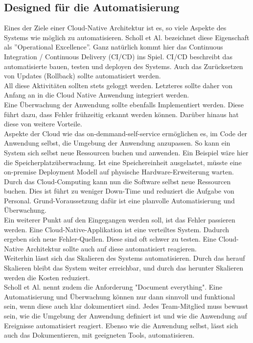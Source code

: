 \subsection{Designed für die Automatisierung}
Eines der Ziele einer Cloud-Native Architektur ist es, so viele Aspekte des Systems wie möglich zu automatisieren. Scholl et Al.\cite{scholl_cloud_2019} bezeichnet diese Eigenschaft als ''Operational Excellence''. Ganz natürlich kommt hier das Continuous Integration / Continuous Delivery (CI/CD) ins Spiel. CI/CD beschreibt das automatisierte bauen, testen und deployen des Systems. Auch das Zurücksetzen von Updates (Rollback) sollte automatisiert werden.\\
All diese Aktivitäten sollten stets geloggt werden. Letzteres sollte daher von Anfang an in die Cloud Native Anwendung integriert werden. \\
Eine Überwachung der Anwendung sollte ebenfalls Implementiert werden. Diese führt dazu, dass Fehler frühzeitig erkannt werden können. Darüber hinaus hat diese von weitere Vorteile.\\
Aspekte der Cloud wie das on-demmand-self-service ermöglichen es, im Code der Anwendung selbst, die Umgebung der Anwendung anzupassen. So kann ein System sich selbst neue Ressourcen buchen und anwenden. Ein Beispiel wäre hier die Speicherplatzüberwachung. Ist eine Speichereinheit ausgelastet, müsste eine on-premise Deployment Modell auf physische Hardware-Erweiterung warten. Durch das Cloud-Computing kann nun die Software selbst neue Ressourcen buchen. Dies ist führt zu weniger Down-Time und reduziert die Aufgabe von Personal. Grund-Voraussetzung dafür ist eine planvolle Automatisierung und Überwachung.\\ 
Ein weiterer Punkt auf den Eingegangen werden soll, ist das Fehler passieren werden. Eine Cloud-Native-Applikation ist eine verteiltes System. Dadurch ergeben sich neue Fehler-Quellen. Diese sind oft schwer zu testen. Eine Cloud-Native Architektur sollte auch auf diese automatisiert reagieren.\\
Weiterhin lässt sich das Skalieren des Systems automatisieren. Durch das herauf Skalieren bleibt das System weiter erreichbar, und durch das herunter Skalieren werden die Kosten reduziert.\\
Scholl et Al.\cite{scholl_cloud_2019} nennt zudem die Anforderung "Document everything". Eine Automatisierung und Überwachung können nur dann sinnvoll und funktional sein, wenn diese auch klar dokumentiert sind. Jedes Team-Mitglied muss bewusst sein, wie die Umgebung der Anwendung definiert ist und wie die Anwendung auf Ereignisse automatisiert reagiert. Ebenso wie die Anwendung selbst, lässt sich auch das Dokumentieren, mit geeigneten Tools, automatisieren.
